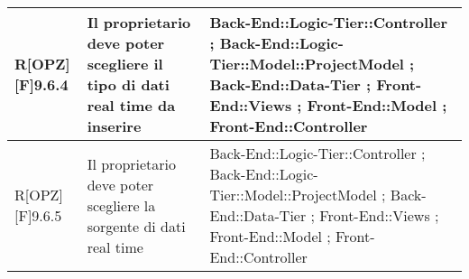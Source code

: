 \begin{table}[h]
\begin{tabular}{|p{}|p{}|p{}|}
			R[OPZ][F]9.6.4 & Il proprietario deve poter scegliere il tipo di dati real time da inserire & Back-End::Logic-Tier::Controller ; Back-End::Logic-Tier::Model::ProjectModel ; Back-End::Data-Tier ; Front-End::Views ; Front-End::Model ; Front-End::Controller \\ \midrule
			R[OPZ][F]9.6.5 & Il proprietario deve poter scegliere la sorgente di dati real time & Back-End::Logic-Tier::Controller ; Back-End::Logic-Tier::Model::ProjectModel ; Back-End::Data-Tier ; Front-End::Views ; Front-End::Model ; Front-End::Controller \\ \midrule

		\end{tabular}
	\end{table}
	\newpage
	
	\begin{table}[h]
		\begin{tabular}{|p{}|p{}|p{}|}
			\midrule


\end{tabular}
\end{table}
